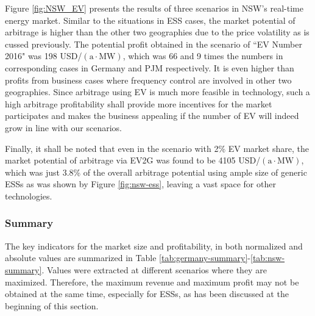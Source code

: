 Figure \ref{fig:NSW_EV} presents the results of three scenarios in NSW's real-time energy market. Similar to the situations in ESS cases, the market potential of arbitrage is higher than the other two geographies due to the price volatility as is cussed previously. The potential profit obtained in the scenario of ``EV Number 2016" was \num{198} USD/$(\text{a} \cdot \text{MW})$, which was 66 and 9 times the numbers in corresponding cases in Germany and PJM respectively. It is even higher than profits from business cases where frequency control are involved in other two geographies. Since arbitrage using EV is much more feasible in technology, such a high arbitrage profitability shall provide more incentives for the market participates and makes the business appealing if the number of EV will indeed grow in line with our scenarios.

Finally, it shall be noted that even in the scenario with 2\% EV market share, the market potential of arbitrage via EV2G was found to be \num{4105} USD/$(\text{a} \cdot \text{MW})$, which was just 3.8\% of the overall arbitrage potential using ample size of generic ESSs as was shown by Figure \ref{fig:nsw-ess}, leaving a vast space for other technologies.

\subsubsection{Summary}

The key indicators for the market size and profitability, in both normalized and absolute values are summarized in Table \ref{tab:germany-summary}-\ref{tab:nsw-summary}. Values were extracted at different scenarios where they are maximized. Therefore, the maximum revenue and maximum profit may not be obtained at the same time, especially for ESSs, as has been discussed at the beginning of this section.

